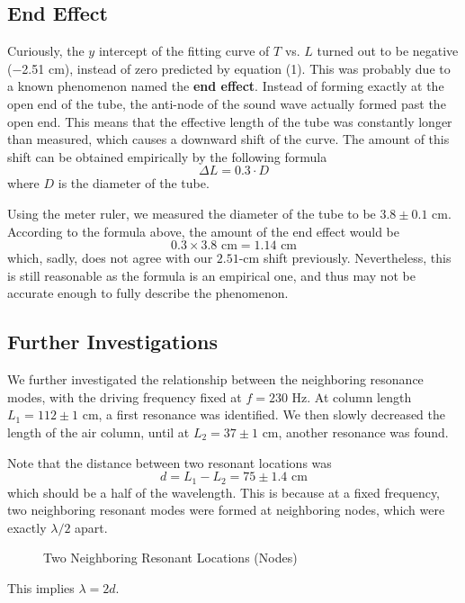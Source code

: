 \subsection{End Effect}
Curiously, the $y$ intercept of the fitting curve of $T$ vs. $L$ turned out to be negative ($-$2.51 cm), instead of zero predicted by equation (1). This was probably due to a known phenomenon named the \textbf{end effect}. Instead of forming exactly at the open end of the tube, the anti-node of the sound wave actually formed past the open end. This means that the effective length of the tube was constantly longer than measured, which causes a downward shift of the curve. The amount of this shift can be obtained empirically by the following formula
$$
\Delta L = 0.3\cdot D
$$
where $D$ is the diameter of the tube.

Using the meter ruler, we measured the diameter of the tube to be $3.8\pm 0.1$ cm. According to the formula above, the amount of the end effect would be
$$
0.3\times 3.8\text{ cm} = 1.14 \text{ cm}
$$
which, sadly, does not agree with our $2.51$-cm shift previously. Nevertheless, this is still reasonable as the formula is an empirical one, and thus may not be accurate enough to fully describe the phenomenon.
\subsection{Further Investigations}
We further investigated the relationship between the neighboring resonance modes, with the driving frequency fixed at $f= 230$ Hz. At column length $L_1= 112 \pm 1$ cm, a first resonance was identified. We then slowly decreased the length of the air column, until at $L_2=37\pm 1$ cm, another resonance was found.

Note that the distance between two resonant locations was
$$
d = L_1 - L_2 = 75\pm1.4\text{ cm}
$$
which should be a half of the wavelength. This is because at a fixed frequency, two neighboring resonant modes were formed at neighboring nodes, which were exactly $\lambda/2$ apart.
\begin{figure}[!htb]
	\caption{Two Neighboring Resonant Locations (Nodes)}
\end{figure}
This implies $\lambda=2d.$

